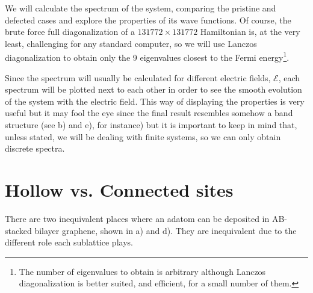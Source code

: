 We will calculate the spectrum of the system, comparing the pristine and defected cases and explore the properties of its wave functions. Of course, the brute force full diagonalization of a $131772\times131772$ Hamiltonian is, at the very least, challenging for any standard computer, so we will use Lanczos diagonalization\cite{Lanczos1950, Ojalvo1970, Arnoldi1951} to obtain only the 9 eigenvalues closest to the Fermi energy\footnote{The number of eigenvalues to obtain is arbitrary although Lanczos diagonalization is better suited, and efficient, for a small number of them.}.

Since the spectrum will usually be calculated for different electric fields, $\mathcal{E}$, each spectrum will be plotted next to each other in order to see the smooth evolution of the system with the electric field. This way of displaying the properties is very useful but it may fool the eye since the final result resembles somehow a band structure (see b) and e), for instance) but it is important to keep in mind that, unless stated, we will be dealing with finite systems, so we can only obtain discrete spectra.


\section{Hollow vs. Connected sites}
There are two inequivalent places where an adatom can be deposited in AB-stacked bilayer graphene, shown in a) and d). They are inequivalent due to the different role each sublattice plays.

